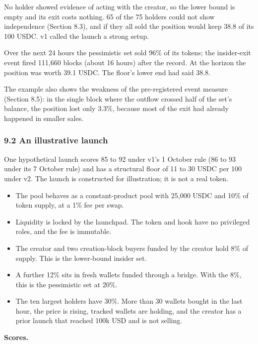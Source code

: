 No holder showed evidence of acting with the creator, so the lower bound is empty and its exit costs nothing. 65 of the 75 holders could not show independence (Section 8.3), and if they all sold the position would keep 38.8 of its 100 USDC. v1 called the launch a strong setup.

Over the next 24 hours the pessimistic set sold 96\% of its tokens; the insider-exit event fired 111,660 blocks (about 16 hours) after the record. At the horizon the position was worth 39.1 USDC. The floor's lower end had said 38.8.

The example also shows the weakness of the pre-registered event measure (Section 8.5): in the single block where the outflow crossed half of the set's balance, the position lost only 3.3\%, because most of the exit had already happened in smaller sales.

\subsubsection{9.2 An illustrative launch}\label{an-illustrative-launch}

One hypothetical launch scores 85 to 92 under v1's 1 October rule (86 to 93 under its 7 October rule) and has a structural floor of 11 to 30 USDC per 100 under v2. The launch is constructed for illustration; it is not a real token.

\begin{itemize}
\tightlist
\item
  The pool behaves as a constant-product pool with 25,000 USDC and 10\% of token supply, at a 1\% fee per swap.
\item
  Liquidity is locked by the launchpad. The token and hook have no privileged roles, and the fee is immutable.
\item
  The creator and two creation-block buyers funded by the creator hold 8\% of supply. This is the lower-bound insider set.
\item
  A further 12\% sits in fresh wallets funded through a bridge. With the 8\%, this is the pessimistic set at 20\%.
\item
  The ten largest holders have 30\%. More than 30 wallets bought in the last hour, the price is rising, tracked wallets are holding, and the creator has a prior launch that reached 100k USD and is not selling.
\end{itemize}

\textbf{Scores.}

